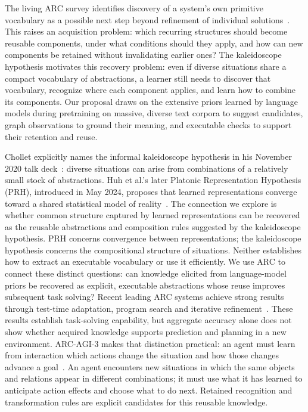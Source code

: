 \documentclass[11pt]{article}
\begin{document}
The living ARC survey identifies discovery of a system's own primitive vocabulary as a possible next step beyond refinement of individual solutions~\cite[Section~5.3.3]{arcsurvey}. This raises an acquisition problem: which recurring structures should become reusable components, under what conditions should they apply, and how can new components be retained without invalidating earlier ones? The kaleidoscope hypothesis motivates this recovery problem: even if diverse situations share a compact vocabulary of abstractions, a learner still needs to discover that vocabulary, recognize where each component applies, and learn how to combine its components. Our proposal draws on the extensive priors learned by language models during pretraining on massive, diverse text corpora to suggest candidates, graph observations to ground their meaning, and executable checks to support their retention and reuse.

Chollet explicitly names the informal kaleidoscope hypothesis in his November 2020 talk deck~\cite{chollet2020}: diverse situations can arise from combinations of a relatively small stock of abstractions. Huh et al.'s later Platonic Representation Hypothesis (PRH), introduced in May 2024, proposes that learned representations converge toward a shared statistical model of reality~\cite{huh}. The connection we explore is whether common structure captured by learned representations can be recovered as the reusable abstractions and composition rules suggested by the kaleidoscope hypothesis. PRH concerns convergence between representations; the kaleidoscope hypothesis concerns the compositional structure of situations. Neither establishes how to extract an executable vocabulary or use it efficiently. We use ARC to connect these distinct questions: can knowledge elicited from language-model priors be recovered as explicit, executable abstractions whose reuse improves subsequent task solving? Recent leading ARC systems achieve strong results through test-time adaptation, program search and iterative refinement~\cite{arcresults2025}. These results establish task-solving capability, but aggregate accuracy alone does not show whether acquired knowledge supports prediction and planning in a new environment. ARC-AGI-3 makes that distinction practical: an agent must learn from interaction which actions change the situation and how those changes advance a goal~\cite{arc3}. An agent encounters new situations in which the same objects and relations appear in different combinations; it must use what it has learned to anticipate action effects and choose what to do next. Retained recognition and transformation rules are explicit candidates for this reusable knowledge.
\end{document}
